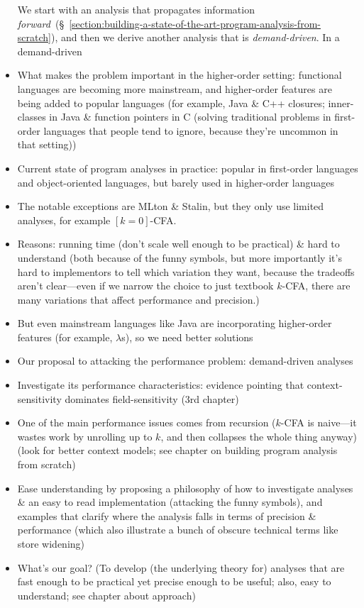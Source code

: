 \documentclass[12pt, oneside]{book}
\begin{document}
\begin{itemize}
  We start with an analysis that propagates information \emph{forward}~(§~\ref{section:building-a-state-of-the-art-program-analysis-from-scratch}), and then we derive another analysis that is \emph{demand-driven}. In a demand-driven 
  \item What makes the problem important in the higher-order setting: functional languages are becoming more mainstream, and higher-order features are being added to popular languages (for example, Java \& C++ closures; inner-classes in Java \& function pointers in C (solving traditional problems in first-order languages that people tend to ignore, because they’re uncommon in that setting))
  \item Current state of program analyses in practice: popular in first-order languages and object-oriented languages, but barely used in higher-order languages
  \item The notable exceptions are MLton \& Stalin, but they only use limited analyses, for example \([k=0]\)-CFA.
  \item Reasons: running time (don’t scale well enough to be practical) \& hard to understand (both because of the funny symbols, but more importantly it’s hard to implementors to tell which variation they want, because the tradeoffs aren’t clear—even if we narrow the choice to just textbook \(k\)-CFA, there are many variations that affect performance and precision.)
  \item But even mainstream languages like Java are incorporating higher-order features (for example, \(λ\)s), so we need better solutions
  \item Our proposal to attacking the performance problem: demand-driven analyses
  \item Investigate its performance characteristics: evidence pointing that context-sensitivity dominates field-sensitivity (3rd chapter)
  \item One of the main performance issues comes from recursion (\(k\)-CFA is naive—it wastes work by unrolling up to \(k\), and then collapses the whole thing anyway) (look for better context models; see chapter on building program analysis from scratch)
  \item Ease understanding by proposing a philosophy of how to investigate analyses \& an easy to read implementation (attacking the funny symbols), and examples that clarify where the analysis falls in terms of precision \& performance (which also illustrate a bunch of obscure technical terms like store widening)
  \item What’s our goal? (To develop (the underlying theory for) analyses that are fast enough to be practical yet precise enough to be useful; also, easy to understand; see chapter about approach)

\end{itemize}
\end{document}
